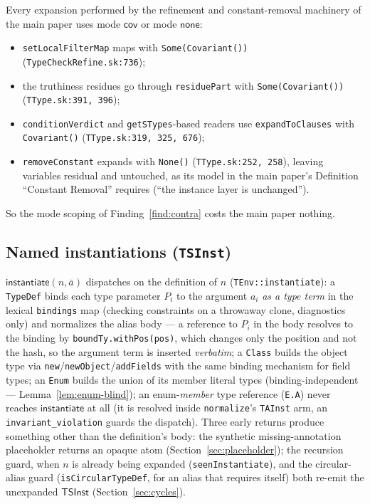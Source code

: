 \documentclass[11pt]{article}
\newcommand{\instop}{\mathsf{instantiate}}
\newcommand{\Cov}{\mathsf{cov}}
\newcommand{\NoneM}{\mathsf{none}}
\begin{document}
\begin{lemma}[Refinement Clients Use Only Modes $\NoneM$/$\Cov$]
\label{lem:clients}
Every expansion performed by the refinement and constant-removal
machinery of the main paper uses mode $\Cov$ or mode $\NoneM$:
\begin{itemize}
\item \texttt{setLocalFilterMap} maps with \texttt{Some(Covariant())}
  (\texttt{TypeCheckRefine.sk:736});
\item the truthiness residues go through \texttt{residuePart} with
  \texttt{Some(Covariant())} (\texttt{TType.sk:391, 396});
\item \texttt{conditionVerdict} and \texttt{getSTypes}-based readers use
  \texttt{expandToClauses} with \texttt{Covariant()}
  (\texttt{TType.sk:319, 325, 676});
\item \texttt{removeConstant} expands with \texttt{None()}
  (\texttt{TType.sk:252, 258}), leaving variables residual and untouched,
  as its model in the main paper's Definition ``Constant Removal''
  requires (``the instance layer is unchanged'').
\end{itemize}
So the mode scoping of Finding~\ref{find:contra} costs the main paper
nothing.
\end{lemma}

\subsection{Named instantiations (\texttt{TSInst})}
\label{sec:tsinst}

$\instop(n, \bar{a})$ dispatches on the definition of $n$
(\texttt{TEnv::instantiate}):
a \texttt{TypeDef} binds each type parameter $P_i$ to the argument
$a_i$ \emph{as a type term} in the lexical \texttt{bindings} map
(checking constraints on a throwaway clone, diagnostics only) and
normalizes the alias body — a reference to $P_i$ in the body resolves to
the binding by \texttt{boundTy.withPos(pos)}, which changes only the
position and not the hash, so the argument term is inserted
\emph{verbatim}; a \texttt{Class} builds the object type via
\texttt{new}/\texttt{newObject}/\texttt{addFields} with the same
binding mechanism for field types; an \texttt{Enum} builds the union of
its member literal types (binding-independent — Lemma~\ref{lem:enum-blind});
an enum-\emph{member} type reference (\texttt{E.A}) never reaches
$\instop$ at all (it is resolved inside \texttt{normalize}'s
\texttt{TAInst} arm, an \texttt{invariant\_violation} guards the
dispatch). Three early returns produce something other than the
definition's body: the synthetic missing-annotation placeholder returns
an opaque atom (Section~\ref{sec:placeholder}); the recursion guard,
when $n$ is already being expanded (\texttt{seenInstantiate}), and the
circular-alias guard (\texttt{isCircularTypeDef}, for an alias that
requires itself) both re-emit the unexpanded $\mathsf{TSInst}$
(Section~\ref{sec:cycles}).
\end{document}
